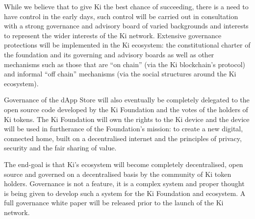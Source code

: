 While we believe that to give Ki the best chance of succeeding, there is a need to have control in the early days, such control will be carried out in consultation with a strong governance and advisory board of varied backgrounds and interests to represent the wider interests of the Ki network. Extensive governance protections will be implemented in the Ki ecosystem: the constitutional charter of the foundation and its governing and advisory boards as well as other mechanisms such as those that are “on chain” (via the Ki blockchain’s protocol) and informal “off chain” mechanisms (via the social structures around the Ki ecosystem). 

Governance of the dApp Store will also eventually be completely delegated to the open source code developed by the Ki Foundation and the votes of the holders of Ki tokens. The Ki Foundation will own the rights to the Ki device and the device will be used in furtherance of the Foundation’s mission: to create a new digital, connected home, built on a decentralised internet and the principles of privacy, security and the fair sharing of value. 

The end-goal is that Ki’s ecosystem will become completely decentralised, open source and governed on a decentralised basis by the community of Ki token holders. Governance is not a feature, it is a complex system and proper thought is being given to develop such a system for the Ki Foundation and ecosystem. A full governance white paper will be released prior to the launch of the Ki network.


